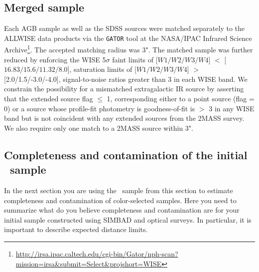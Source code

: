 \subsection{Merged sample}
Each AGB sample as well as the SDSS sources were matched separately to the ALLWISE data products via the {\tt GATOR} tool at the NASA/IPAC Infrared Science Archive\footnote{\url{http://irsa.ipac.caltech.edu/cgi-bin/Gator/nph-scan?mission=irsa&submit=Select&projshort=WISE}}. The accepted matching radius was 3". The matched sample was further reduced by enforcing the WISE 5$\sigma$ faint limits of [$W1/W2/W3/W4$] $<$ [$16.83/15.6/11.32/8.0$], saturation limits of [$W1/W2/W3/W4$] $>$ [2.0/1.5/-3.0/-4.0], signal-to-noise ratios greater than 3 in each WISE band. We constrain the possibility for a mismatched extragalactic IR source by asserting that the extended source flag $\le$ 1, corresponding either to a point source (flag = 0) or a source whose profile-fit photometry is goodness-of-fit is $>$ 3 in any WISE band but is not coincident with any extended sources from the 2MASS survey. We also require only one match to a 2MASS source within 3".

{\color{red}{How was it merged, which further cuts and why...}}


\subsection{Completeness and contamination of the initial \agb\ sample}

In the next section you are using the \agb\ sample from this section to 
estimate completeness and contamination of color-selected samples. Here
you need to summarize what do you believe completeness and contamination
are for your initial sample constructed using SIMBAD and optical surveys.
In particular, it is important to describe expected distance limits. 








